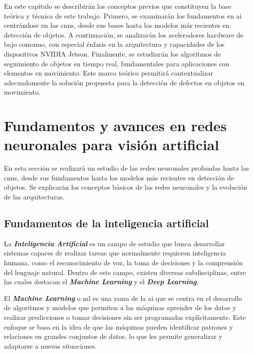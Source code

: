 \documentclass[11pt,spanish,listoffigures,listoftables]{tfgetsinf}
\begin{document}
En este capítulo se describirán los conceptos previos que constituyen la base teórica y técnica de este trabajo. Primero, se examinarán los fundamentos en \gls{ai} centrándose en las \glspl{cnn}, desde sus bases hasta los modelos más recientes en detección de objetos. A continuación, se analizarán los aceleradores hardware de bajo consumo, con especial énfasis en la arquitectura y capacidades de los dispositivos NVIDIA Jetson. Finalmente, se estudiarán los algoritmos de seguimiento de objetos en tiempo real, fundamentales para aplicaciones con elementos en movimiento. Este marco teórico permitirá contextualizar adecuadamente la solución propuesta para la detección de defectos en objetos en movimiento.

\section{Fundamentos y avances en redes neuronales para visión artificial} \label{sec:fundamentos_avances}
En esta sección se realizará un estudio de las redes neuronales profundas hasta las \glspl{cnn}, desde sus fundamentos hasta los modelos más recientes en detección de objetos. Se explicarán los conceptos básicos de las redes neuronales y la evolución de las arquitecturas.

\subsection{Fundamentos de la inteligencia artificial} \label{sec:fundamentos_inteligencia_artificial}
La \textit{\textbf{Inteligencia Artificial}} es un campo de estudio que busca desarrollar sistemas capaces de realizar tareas que normalmente requieren inteligencia humana, como el reconocimiento de voz, la toma de decisiones y la comprensión del lenguaje natural. Dentro de este campo, existen diversas 
subdisciplinas, entre las cuales destacan el \textit{\textbf{Machine Learning}} y el \textit{\textbf{Deep Learning}}.

El \textit{\textbf{Machine Learning}} o \gls{ml} es una rama de la \gls{ai} que se centra en el desarrollo de algoritmos y modelos que permiten a las máquinas aprender de los datos y realizar predicciones o tomar decisiones sin ser programadas explícitamente. Este enfoque se basa en la idea de que las máquinas pueden identificar patrones y relaciones en grandes conjuntos de datos, lo que les permite generalizar y adaptarse a nuevas situaciones.
\end{document}
